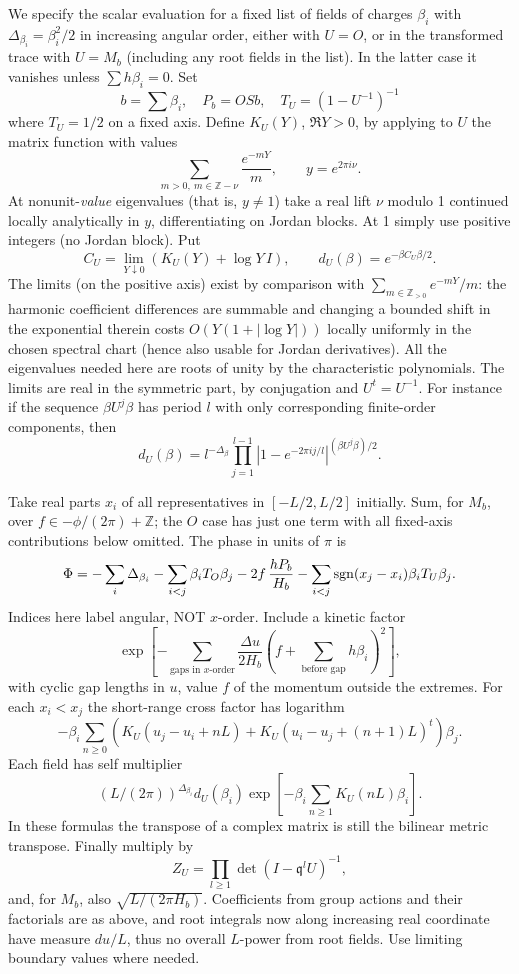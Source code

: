 \documentclass[11pt]{article}
\numberwithin{equation}{section}
\theoremstyle{definition}\newtheorem{definition}[theorem]{Definition}
\theoremstyle{remark}\newtheorem{remark}[theorem]{Remark}
\begin{document}
We specify the scalar evaluation for a fixed list of fields of charges \(\beta_i\) with \(\Delta_{\beta_i}=\beta_i^2/2\) in increasing angular order, either with \(U=O\), or in the transformed trace with \(U=M_b\) (including any root fields in the list). In the latter case it vanishes unless
\(\sum h\beta_i=0\). Set
\[
 b=\sum\beta_i,\quad P_b=OS b,\quad T_U=(1-U^{-1})^{-1}
\]
where \(T_U=1/2\) on a fixed axis. Define \(K_U(Y)\), \(\Re Y>0\), by applying to \(U\) the matrix function with values
\[
 \sum_{m>0,\ m\in\mathbb Z-\nu}\frac{e^{-mY}}m ,
 \qquad y=e^{2\pi i\nu}.
\]
At nonunit-\emph{value} eigenvalues (that is, \(y\ne1\)) take a real lift \(\nu\) modulo 1 continued locally analytically in \(y\), differentiating on Jordan blocks. At 1 simply use positive integers (no Jordan block). Put
\[
 C_U=\lim_{Y\downarrow0}(K_U(Y)+\log Y\,I),\qquad
 d_U(\beta)=e^{-\beta C_U\beta/2}.
\]
The limits (on the positive axis) exist by comparison with \(\sum_{m\in\mathbb Z_{>0}}e^{-mY}/m\): the harmonic coefficient differences are summable and changing a bounded shift in the exponential therein costs \(O(Y(1+|\log Y|))\) locally uniformly in the chosen spectral chart (hence also usable for Jordan derivatives). All the eigenvalues needed here are roots of unity by the characteristic polynomials. The limits are real in the symmetric part, by conjugation and \(U^t=U^{-1}\). For instance if the sequence \(\beta U^j\beta\) has period \(l\) with only corresponding finite-order components, then
\[
 d_U(\beta)=l^{-\Delta_\beta}\prod_{j=1}^{l-1}|1-e^{-2\pi i j/l}|^{(\beta U^j\beta)/2}.
\]

Take real parts \(x_i\) of all representatives in \([-L/2,L/2]\) initially. Sum, for \(M_b\), over \(f\in-\phi/(2\pi)+\mathbb Z\); the \(O\) case has just one term with all fixed-axis contributions below omitted. The phase in units of \(\pi\) is
\[
 \Phi=-\sum_i\Delta_{\beta_i}-\sum_{i<j}\beta_i T_O\beta_j
 -2 f\,\frac{hP_b}{H_b}
 -\sum_{i<j}{\rm sgn}(x_j-x_i)\beta_i T_U\beta_j.
\]
Indices here label angular, NOT \(x\)-order. Include a kinetic factor
\[
 \exp\left[-\sum_{\text{gaps in }x\text{-order}}\frac{\Delta u}{2H_b}
       \left(f+\sum_{\text{before gap}}h\beta_i\right)^2\right],
\]
with cyclic gap lengths in \(u\), value \(f\) of the momentum outside the extremes. For each \(x_i<x_j\) the short-range cross factor has logarithm
\[
 -\beta_i\sum_{n\ge0}\left(K_U(u_j-u_i+nL)
             +K_U(u_i-u_j+(n+1)L)^t\right)\beta_j.
\]
Each field has self multiplier
\[
 (L/(2\pi))^{\Delta_{\beta_i}}d_U(\beta_i)
     \exp\left[-\beta_i\sum_{n\ge1}K_U(nL)\beta_i\right].
\]
In these formulas the transpose of a complex matrix is still the bilinear metric transpose. Finally multiply by
\[
 Z_U=\prod_{l\ge1}\det(I-\mathfrak q^l U)^{-1},
\]
and, for \(M_b\), also \(\sqrt{L/(2\pi H_b)}\). Coefficients from group actions and their factorials are as above, and root integrals now along increasing real coordinate have measure \(du/L\), thus no overall \(L\)-power from root fields. Use limiting boundary values where needed.
\end{document}
